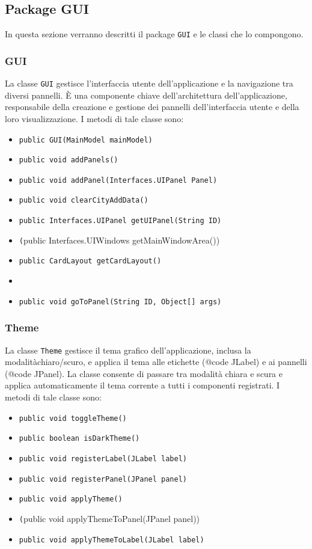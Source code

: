 \subsection{Package GUI}
In questa sezione verranno descritti il package \texttt{GUI} e le classi che lo compongono.\\

\subsubsection {GUI}
La classe \texttt{GUI} gestisce l'interfaccia utente dell'applicazione e la navigazione tra diversi pannelli. 
È una componente chiave dell'architettura dell'applicazione, responsabile della creazione e gestione dei pannelli dell'interfaccia utente e della loro visualizzazione.
I metodi di tale classe sono:
\begin{itemize}
    \item \texttt{public GUI(MainModel mainModel)}
    \item \texttt{public void addPanels()}
    \item \texttt{public void addPanel(Interfaces.UIPanel Panel)}
    \item \texttt{public void clearCityAddData()}
    \item \texttt{public Interfaces.UIPanel getUIPanel(String ID)}
    \item \texttt(public Interfaces.UIWindows getMainWindowArea())
    \item \texttt{public CardLayout getCardLayout()}
    \item {}
    \item \texttt{public void goToPanel(String ID, Object[] args)}
\end{itemize}

\subsubsection {Theme}
La classe \texttt{Theme} gestisce il tema grafico dell'applicazione, inclusa la modalitàchiaro/scuro, e applica il tema alle etichette ({@code JLabel}) e ai pannelli ({@code JPanel}).
La classe consente di passare tra modalità chiara e scura e applica automaticamente il tema corrente a tutti i componenti registrati.
I metodi di tale classe sono:
\begin{itemize}
    \item \texttt{public void toggleTheme()}
    \item \texttt{public boolean isDarkTheme()}
    \item \texttt{public void registerLabel(JLabel label)}
    \item \texttt{public void registerPanel(JPanel panel)}
    \item \texttt{public void applyTheme()}
    \item \texttt(public void applyThemeToPanel(JPanel panel))
    \item \texttt{public void applyThemeToLabel(JLabel label)}
\end{itemize}

